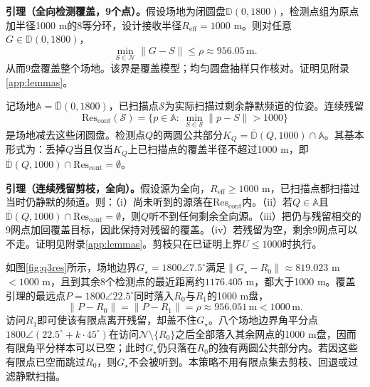\documentclass{cumcmthesis}
\begin{document}
\textbf{引理（全向检测覆盖，9个点）。}假设场地为闭圆盘$\mathbb{D}(0,1800)$，检测点组为原点加半径1000 m的8等分环，设计接收半径$R_{\mathrm{eff}}=1000$ m。则对任意$G\in\mathbb{D}(0,1800)$，
\[
\min_{S\in\mathcal{N}}\|G-S\|\le\rho\approx 956.05\,\mathrm{m}.
\]
从而9盘覆盖整个场地。该界是覆盖模型；均匀圆盘抽样只作核对。证明见附录\ref{app:lemmas}。

记场地$\mathbb{A}=\overline{\mathbb{D}}(0,1800)$，已扫描点$\mathcal{S}$为实际扫描过剩余静默频道的位姿。连续残留
\begin{equation}
\mathrm{Res}_{\mathrm{cont}}(\mathcal{S})=\bigl\{p\in\mathbb{A}:\ \min_{S\in\mathcal{S}}\|p-S\|>1000\bigr\}
\label{eq:rescont}
\end{equation}
是场地减去这些闭圆盘。检测点$Q$的两圆公共部分$K_Q=\overline{\mathbb{D}}(Q,1000)\cap\mathbb{A}$。其基本形式为：丢掉$Q$当且仅当$K_Q$上已扫描点的覆盖半径不超过1000 m，即$\overline{\mathbb{D}}(Q,1000)\cap\mathrm{Res}_{\mathrm{cont}}=\emptyset$。

\textbf{引理（连续残留剪枝，全向）。}假设源为全向，$R_{\mathrm{eff}}\ge 1000$ m，已扫描点都扫描过当时仍静默的频道。则：（i）尚未听到的源落在$\mathrm{Res}_{\mathrm{cont}}$内。（ii）若$Q\in\mathbb{A}$且$\overline{\mathbb{D}}(Q,1000)\cap\mathrm{Res}_{\mathrm{cont}}=\emptyset$，则$Q$听不到任何剩余全向源。（iii）把仍与残留相交的9网点加回覆盖目标，因此保持对残留的覆盖。（iv）若残留为空，剩余9网点可以不走。证明见附录\ref{app:lemmas}。剪枝只在已证明上界$U\le 1000$时执行。

如图\ref{fig:q3res}所示，场地边界$G_\star=1800\angle 7.5^\circ$满足$\|G_\star-R_0\|\approx 819.023$ m$<1000$ m，且到其余8个检测点的最近距离约$1176.405$ m，都大于1000 m。覆盖引理的最远点$P=1800\angle 22.5^\circ$同时落入$R_0$与$R_1$的1000 m盘，
\[
\|P-R_0\|=\|P-R_1\|=\rho\approx 956.051\,\mathrm{m}<1000\,\mathrm{m}.
\]
访问$R_1$即可使该有限点离开残留，却盖不住$G_\star$。八个场地边界角平分点$1800\angle(22.5^\circ+k\cdot 45^\circ)$在访问$\mathcal{N}\setminus\{R_0\}$之后全部落入其余网点的1000 m盘，因而有限角平分样本可以已空；此时$G_\star$仍只落在$R_0$的独有两圆公共部分内。若因这些有限点已空而跳过$R_0$，则$G_\star$不会被听到。本策略不用有限点集去剪枝、回退或过滤静默扫描。
\end{document}
